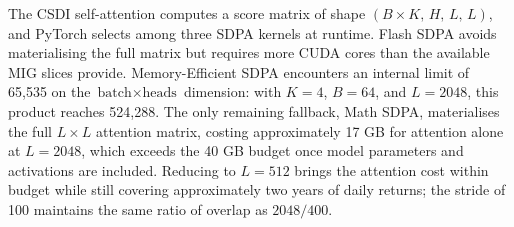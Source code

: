 The CSDI self-attention computes a score matrix of shape \((B \times K,\, H,\, L,\, L)\), and
PyTorch selects among three SDPA kernels at runtime. Flash SDPA avoids materialising
the full matrix but requires more CUDA cores than the available MIG slices provide.
Memory-Efficient SDPA encounters an internal limit of 65,535 on the
\(\text{batch} \times \text{heads}\) dimension: with \(K = 4\), \(B = 64\), and
\(L = 2048\), this product reaches 524,288. The only remaining fallback, Math SDPA,
materialises the full \(L \times L\) attention matrix, costing approximately 17 GB for
attention alone at \(L = 2048\), which exceeds the 40 GB budget once model parameters
and activations are included. Reducing to \(L = 512\) brings the attention cost within
budget while still covering approximately two years of daily returns; the stride of 100
maintains the same ratio of overlap as \(2048/400\).